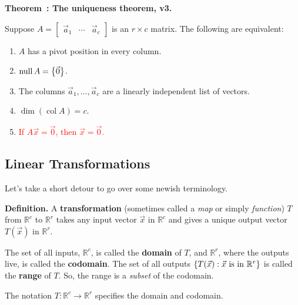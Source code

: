 \documentclass[11pt, letterpaper]{report}
\newenvironment{notes}{}{}
\let\originalleft\left
\let\originalright\right
\renewcommand{\left}{\mathopen{}\mathclose\bgroup\originalleft}
\renewcommand{\right}{\aftergroup\egroup\originalright}
\newenvironment{definition}{\begin{bbox}\par\noindent\textbf{Definition. }}
  {\end{bbox}}
\newcounter{theorem}[chapter]
\newenvironment{theorem}[1][]{\refstepcounter{theorem}\begin{bbox}\par
    \noindent\textbf{Theorem~\thetheorem: #1}}{\end{bbox}}
\newlength\oldfboxsep%
\newlength\myminiwidth%
\newenvironment{bbox}{%
  \setlength\oldfboxsep\fboxsep
  \setlength{\fboxsep}{.1in}%
  \setlength\myminiwidth\linewidth%
  \addtolength\myminiwidth{-0.2in}%
  \vspace{0.1in}%
  \begin{lrbox}{\bboxbox}\begin{minipage}{\myminiwidth}%
    }{%
    \end{minipage}\end{lrbox}%
  \noindent\fbox{\usebox{\bboxbox}}\vspace{0.1in}\setlength\fboxsep\oldfboxsep%
}
\newcommand{\R}{\mathbb{R}}
\DeclareMathOperator{\col}{col}
\DeclareMathOperator{\nul}{null}
\begin{document}
\begin{theorem}[The uniqueness theorem, v3.]   
\label{theorem:1.7uniqueness-v3}

Suppose $A =
\begin{bmatrix}
\vec{a}_1 & \cdots & \vec{a}_c
\end{bmatrix}
$ is an $r \times c$ matrix. The following are equivalent:
\begin{enumerate}[label=(\roman*)]
\item $A$ has a pivot position in every column.
\item $\nul A = \left\{ \vec{0} \right\}$.
\item The columns $\vec{a}_1, \ldots, \vec{a}_c$ are a linearly independent list of vectors.
\item $\dim(\col A) = c$.
\item \textcolor{red}{If $A\vec{x}=\vec{0}$, then $\vec{x}=\vec{0}$.}
\end{enumerate}
\end{theorem}

\begin{notes}
\vfill
\end{notes}

\subsection{Linear Transformations}\label{subsec:linear-transformations}

Let's take a short detour to go over some newish terminology.

\begin{definition}   
A \textbf{transformation} (sometimes called a \emph{map} or simply \emph{function}) $T$ from $\R^c$ to $\R^r$ takes any input vector $\vec{x}$ in $\R^c$ and gives a unique output vector $T(\vec{x})$ in $\R^r$.

The set of all inputs, $\R^c$, is called the \textbf{domain} of $T$, and $\R^r$, where the outputs live, is called the \textbf{codomain}.  The set of all outputs $\left\{T(\vec{x}) : \vec{x} \textrm{ is in } \R^r\right\}$ is called the \textbf{range} of $T$. So, the range is a \emph{subset} of the codomain.

The notation $T:\R^c \rightarrow \R^r$ specifies the domain and codomain.
\end{definition}

\begin{notes}
\newpage
\end{notes}
\end{document}

